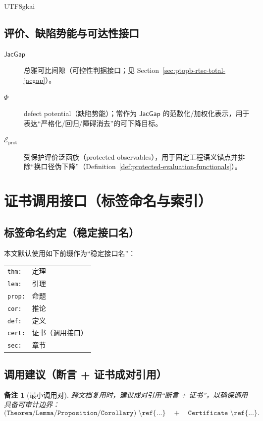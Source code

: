 \documentclass[12pt]{article}
\newtheorem{remark}{备注}[section]
\newcommand{\JacGap}{\ensuremath{\mathsf{JacGap}}}
\begin{document}
\begin{CJK*}{UTF8}{gkai}
\subsection{评价、缺陷势能与可达性接口}
\begin{description}
  \item[$\JacGap$] 总雅可比间隙（可控性判据接口；见 Section~\ref{sec:ptopb-rtsc-total-jacgap}）。
  \item[$\Phi$] defect potential（缺陷势能）；常作为 $\JacGap$ 的范数化/加权化表示，用于表达“严格化/回归/障碍消去”的可下降目标。
  \item[$\mathcal{E}_{\mathrm{prot}}$] 受保护评价泛函族（protected observables），用于固定工程语义锚点并排除“换口径伪下降”（Definition~\ref{def:protected-evaluation-functionals}）。
\end{description}

\clearpage
\section{证书调用接口（标签命名与索引）}
\label{app:certificate-api}

\subsection{标签命名约定（稳定接口名）}
本文默认使用如下前缀作为“稳定接口名”：
\begin{center}
\renewcommand{\arraystretch}{1.05}
\begin{tabular}{>{\raggedright\arraybackslash}p{} >{\raggedright\arraybackslash}p{}}
  \texttt{thm:}  & 定理 \\
  \texttt{lem:}  & 引理 \\
  \texttt{prop:} & 命题 \\
  \texttt{cor:}  & 推论 \\
  \texttt{def:}  & 定义 \\
  \texttt{cert:} & 证书（调用接口） \\
  \texttt{sec:}  & 章节 \\
\end{tabular}
\end{center}

\subsection{调用建议（断言 + 证书成对引用）}
\begin{remark}[最小调用对]
跨文档复用时，建议成对引用“断言 + 证书”，以确保调用具备可审计边界：
\[
\texttt{(Theorem/Lemma/Proposition/Corollary)~\textbackslash ref\{...\}}
\quad+\quad
\texttt{Certificate~\textbackslash ref\{...\}}.
\]
\end{remark}


\end{CJK*}
\end{document}
